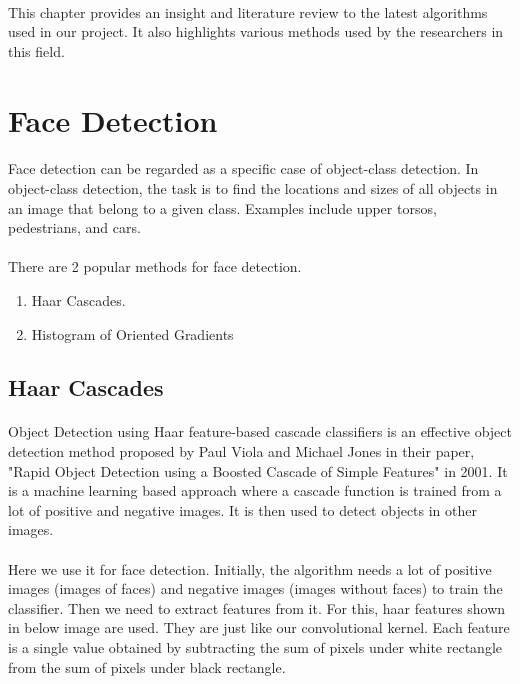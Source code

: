 \paragraph{}This chapter provides an insight and literature review to the latest algorithms used in our project. It also highlights various methods used by the researchers in this field.

\section{Face Detection}
\paragraph{}Face detection can be regarded as a specific case of object-class detection. In object-class detection, the task is to find the locations and sizes of all objects in an image that belong to a given class. Examples include upper torsos, pedestrians, and cars.
 
\paragraph{} There are 2 popular methods for face detection.
\begin{enumerate}
	\item Haar Cascades.
	\item Histogram of Oriented Gradients
\end{enumerate}  
	\subsection{Haar Cascades}
	
	\paragraph{}Object Detection using Haar feature-based cascade classifiers is an effective object detection method proposed by Paul Viola and Michael Jones in their paper, "Rapid Object Detection using a Boosted Cascade of Simple Features" in 2001. It is a machine learning based approach where a cascade function is trained from a lot of positive and negative images. It is then used to detect objects in other images.
	
	\paragraph{}Here we use it for face detection. Initially, the algorithm needs a lot of positive images (images of faces) and negative images (images without faces) to train the classifier. Then we need to extract features from it. For this, haar features shown in below image are used. They are just like our convolutional kernel. Each feature is a single value obtained by subtracting the sum of pixels under white rectangle from the sum of pixels under black rectangle.
	
